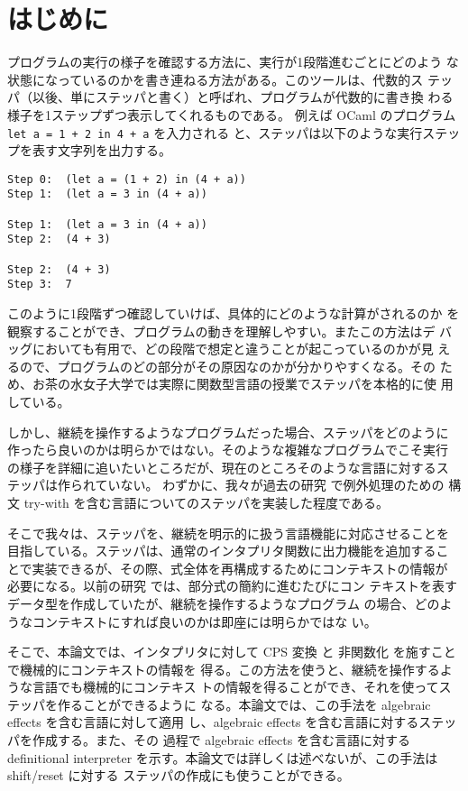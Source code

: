 \section{はじめに}

プログラムの実行の様子を確認する方法に、実行が1段階進むごとにどのよう
な状態になっているのかを書き連ねる方法がある。このツールは、代数的ス
テッパ（以後、単にステッパと書く）と呼ばれ、プログラムが代数的に書き換
わる様子を1ステップずつ表示してくれるものである。
例えば OCaml のプログラム \texttt{let a = 1 + 2 in 4 + a} を入力される
と、ステッパは以下のような実行ステップを表す文字列を出力する。

\begin{verbatim}
Step 0:  (let a = (1 + 2) in (4 + a))
Step 1:  (let a = 3 in (4 + a))

Step 1:  (let a = 3 in (4 + a))
Step 2:  (4 + 3)

Step 2:  (4 + 3)
Step 3:  7
\end{verbatim}

このように1段階ずつ確認していけば、具体的にどのような計算がされるのか
を観察することができ、プログラムの動きを理解しやすい。またこの方法はデ
バッグにおいても有用で、どの段階で想定と違うことが起こっているのかが見
えるので、プログラムのどの部分がその原因なのかが分かりやすくなる。その
ため、お茶の水女子大学では実際に関数型言語の授業でステッパを本格的に使
用している。

しかし、継続を操作するようなプログラムだった場合、ステッパをどのように
作ったら良いのかは明らかではない。そのような複雑なプログラムでこそ実行
の様子を詳細に追いたいところだが、現在のところそのような言語に対するス
テッパは作られていない。
わずかに、我々が過去の研究 \cite{FCA19} で例外処理のための
構文 try-with を含む言語についてのステッパを実装した程度である。

そこで我々は、ステッパを、継続を明示的に扱う言語機能に対応させることを
目指している。ステッパは、通常のインタプリタ関数に出力機能を追加するこ
とで実装できるが、その際、式全体を再構成するためにコンテキストの情報が
必要になる。以前の研究 \cite{FCA19} では、部分式の簡約に進むたびにコン
テキストを表すデータ型を作成していたが、継続を操作するようなプログラム
の場合、どのようなコンテキストにすれば良いのかは即座には明らかではな
い。

そこで、本論文では、インタプリタに対して CPS 変換 \cite{PLOTKIN1975125} と
非関数化 \cite{Reynolds1998} を施すことで機械的にコンテキストの情報を
得る。この方法を使うと、継続を操作するような言語でも機械的にコンテキス
トの情報を得ることができ、それを使ってステッパを作ることができるように
なる。本論文では、この手法を algebraic effects を含む言語に対して適用
し、algebraic effects を含む言語に対するステッパを作成する。また、その
過程で algebraic effects を含む言語に対する definitional interpreter
を示す。本論文では詳しくは述べないが、この手法は shift/reset に対する
ステッパの作成にも使うことができる。

